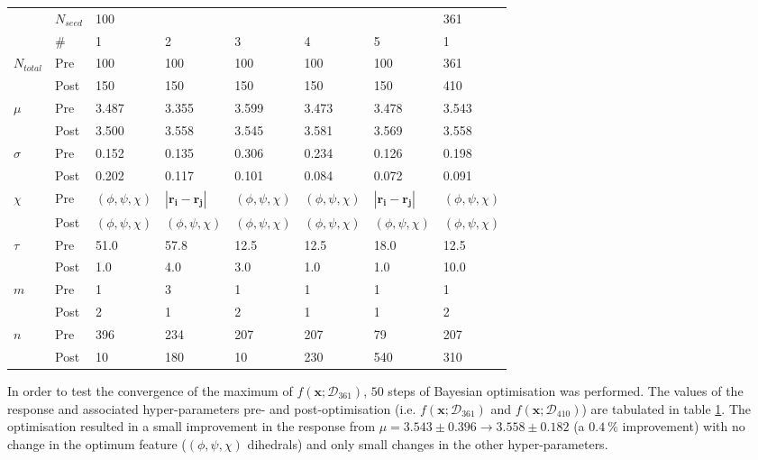 \begin{table}
    \centering
    \begin{tabular}{|ll|lllll|l|}
    \hline
    &$N_{seed}$ & 100 & & & & &361\\
    &\#&1&2&3&4&5&1\\
    \hline\hline
    $N_{total}$&Pre&100&100&100&100&100&361\\
    &Post&150&150&150&150&150&410\\
    \hline
    $\mu$&Pre&3.487&3.355&3.599&3.473&3.478&3.543\\
    &Post&3.500&3.558&3.545&3.581&3.569&3.558\\
    \hline
    $\sigma$&Pre&0.152&0.135&0.306&0.234&0.126&0.198\\
    &Post&0.202&0.117&0.101&0.084&0.072&0.091\\
    \hline
    $\chi$&Pre&$(\phi,\psi,\chi)$&$|\mathbf{r_{i}}-\mathbf{r_{j}}|$&$(\phi,\psi,\chi)$&$(\phi,\psi,\chi)$&$|\mathbf{r_{i}}-\mathbf{r_{j}}|$&$(\phi,\psi,\chi)$\\
    &Post&$(\phi,\psi,\chi)$&$(\phi,\psi,\chi)$&$(\phi,\psi,\chi)$&$(\phi,\psi,\chi)$&$(\phi,\psi,\chi)$&$(\phi,\psi,\chi)$\\
    \hline
    $\tau$&Pre&51.0&57.8&12.5&12.5&18.0&12.5\\
    &Post&1.0&4.0&3.0&1.0&1.0&10.0\\
    \hline
    $m$&Pre&1&3&1&1&1&1\\
    &Post&2&1&2&1&1&2\\
    \hline
    $n$&Pre&396&234&207&207&79&207\\
    &Post&10&180&10&230&540&310\\
    \hline
    \end{tabular}
    \label{tab:aadh_opt_results}
\end{table}

In order to test the convergence of the maximum of $f(\mathbf{x}; \mathcal{D}_{361})$, $50$ steps of Bayesian optimisation was performed. The values of the response and associated hyper-parameters pre- and post-optimisation (i.e. $f(\mathbf{x}; \mathcal{D}_{361})$ and $f(\mathbf{x}; \mathcal{D}_{410})$) are tabulated in table \ref{tab:aadh_opt_results}. The optimisation resulted in a small improvement in the response from $\mu=3.543 \pm 0.396 \rightarrow 3.558 \pm 0.182$ (a $\SI{0.4}{\percent}$ improvement) with no change in the optimum feature ($(\phi, \psi, \chi)$ dihedrals) and only small changes in the other hyper-parameters.  

